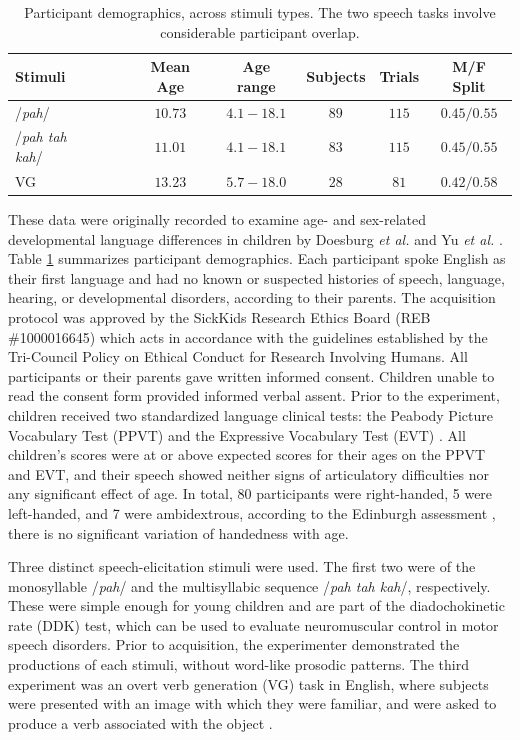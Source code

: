 \documentclass[fleqn,10pt]{wlscirep}
\begin{document}
\begin{table}[h]
  \centering
  \begin{tabular}{ l@{}c c c c c }
    \toprule
    \textbf{Stimuli} & \textbf{Mean Age} & \textbf{Age range} & \textbf{Subjects} & \textbf{Trials}  & \textbf{M/F Split} \\
    \midrule
    /{\em pah}/~~~                    & $10.73$ & $4.1-18.1$   &   $89$   &   $115$   &   $0.45/0.55$ \\
    /{\em pah tah kah}/~~~            & $11.01$ & $4.1-18.1$   &   $83$   &   $115$   &   $0.45/0.55$ \\
    VG~~~                             & $13.23$ & $5.7-18.0$   &   $28$   &   $81$    &   $0.42/0.58$  \\
    \bottomrule
  \end{tabular}
  \caption{Participant demographics, across stimuli types. The two speech tasks involve considerable participant overlap.}
  \label{tab:subjects}
\end{table}
These data were originally recorded to examine age- and sex-related developmental language differences in children by Doesburg {\em et al.} \cite{Doesburg2016} and Yu {\em et al.} \cite{Yu2014}. Table \ref{tab:subjects} summarizes participant demographics. Each participant spoke English as their first language and had no known or suspected histories of speech, language, hearing, or developmental disorders, according to their parents. The acquisition protocol was approved by the SickKids Research Ethics Board (REB \#1000016645) which acts in accordance with the guidelines established by the Tri-Council Policy on Ethical Conduct for Research Involving Humans. All participants or their parents gave written informed consent. Children unable to read the consent form provided informed verbal assent. Prior to the experiment, children received two standardized language clinical tests: the Peabody Picture Vocabulary Test (PPVT) \cite{Dunn97} and the Expressive Vocabulary Test (EVT) \cite{EVT}. All children's scores were at or above expected scores for their ages on the PPVT and EVT, and their speech showed neither signs of articulatory difficulties nor any significant effect of age. In total, 80 participants were right-handed, 5 were left-handed, and 7 were ambidextrous, according to the Edinburgh assessment \cite{Oldfield1971}, there is no significant variation of handedness with age. 

Three distinct speech-elicitation stimuli were used. The first two were of the monosyllable /{\em pah}/ and the multisyllabic sequence /{\em pah tah kah}/, respectively. These were simple enough for young children and are part of the diadochokinetic rate (DDK) test, which can be used to evaluate neuromuscular control in motor speech disorders. Prior to acquisition, the experimenter demonstrated the productions of each stimuli, without word-like prosodic patterns. The third experiment was an overt verb generation (VG) task in English, where subjects were presented with an image with which they were familiar, and were asked to produce a verb associated with the object \cite{Doesburg2016}.
\end{document}
